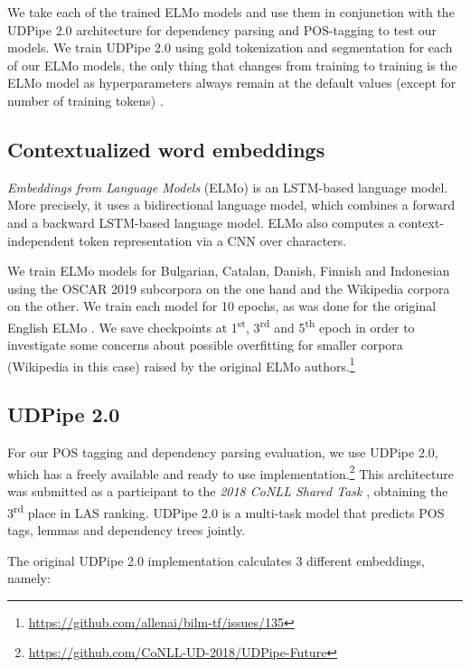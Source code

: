 We take each of the trained ELMo models and use them in conjunction with the UDPipe 2.0 \citep{straka-2018-udpipe,straka-strakova-2019-evaluating} architecture for dependency parsing and POS-tagging to test our models. We train UDPipe 2.0 using gold tokenization and segmentation for each of our ELMo models, the only thing that changes from training to training is the ELMo model as hyperparameters always remain at the default values (except for number of training tokens) \citep{peters-etal-2018-deep}.

\subsection{Contextualized word embeddings}

\emph{Embeddings from Language Models} (ELMo) \citep{peters-etal-2018-deep} is an LSTM-based language model. More precisely, it uses a bidirectional language model, which combines a forward and a backward LSTM-based language model. ELMo also computes a context-independent token representation via a CNN over characters.

We train ELMo models for Bulgarian, Catalan, Danish, Finnish and Indonesian using the OSCAR 2019 subcorpora on the one hand and the Wikipedia corpora on the other. We train each model for 10 epochs, as was done for the original English ELMo \citep{peters-etal-2018-deep}. We save checkpoints at 1\textsuperscript{st}, 3\textsuperscript{rd} and 5\textsuperscript{th} epoch in order to investigate some concerns about possible overfitting for smaller corpora (Wikipedia in this case) raised by the original ELMo authors.\footnote{\url{https://github.com/allenai/bilm-tf/issues/135}}

\subsection{UDPipe 2.0} \label{udpipe-future}

For our POS tagging and dependency parsing evaluation, we use UDPipe 2.0, which has a freely available and ready to use implementation.\footnote{\url{https://github.com/CoNLL-UD-2018/UDPipe-Future}} This architecture was submitted as a participant to the \emph{2018 CoNLL Shared Task} \citep{zeman-etal-2018-conll}, obtaining the 3\textsuperscript{rd} place in LAS ranking. UDPipe 2.0 is a multi-task model that predicts POS tags, lemmas and dependency trees jointly.

The original UDPipe 2.0 implementation calculates 3 different embeddings, namely:

